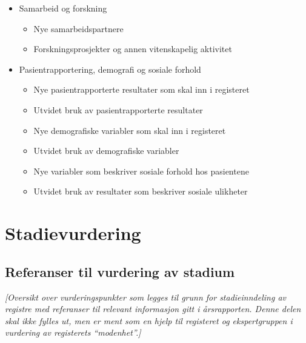\documentclass[norsk, a4paper, twocolumn]{report}
\newcommand{\guide}[1] {
	\textit{[\textcolor{guidegray}{#1}]}
	}
\begin{document}
\begin{itemize}
  \item Samarbeid og forskning
    \begin{itemize}
      \item Nye samarbeidspartnere
      \item Forskningsprosjekter og annen vitenskapelig aktivitet
    \end{itemize}
  \item Pasientrapportering, demografi og sosiale forhold
    \begin{itemize}
      \item Nye pasientrapporterte resultater som skal inn i registeret
      \item Utvidet bruk av pasientrapporterte resultater
      \item Nye demografiske variabler som skal inn i registeret
      \item Utvidet bruk av demografiske variabler
      \item Nye variabler som beskriver sosiale forhold hos pasientene
      \item Utvidet bruk av resultater som beskriver sosiale ulikheter
    \end{itemize}
\end{itemize}






\part{Stadievurdering}
\chapter{Referanser til vurdering av stadium}
\guide{Oversikt over vurderingspunkter som legges til grunn for
stadieinndeling av registre med referanser til relevant informasjon
gitt i årsrapporten. Denne delen skal ikke fylles ut, men er ment som en
hjelp til registeret og ekspertgruppen i vurdering av registerets
``modenhet''.}
\end{document}
